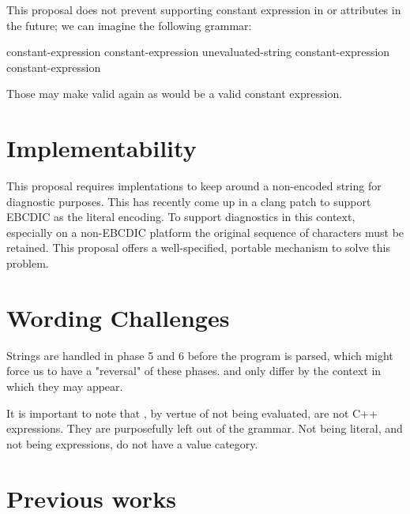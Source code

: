 \documentclass{wg21}
\begin{document}
This proposal does not prevent supporting constant expression in  or attributes in
the future; we can imagine the following grammar:

\begin{bnf}
    \br
     \terminal{(} constant-expression \terminal{)} \terminal{;}\br
     \terminal{(} constant-expression \terminal{,} unevaluated-string \terminal{)} \terminal{;}\br
     \terminal{(} constant-expression \terminal{,} constant-expression \terminal{)} \terminal{;}
\end{bnf}

Those may make  valid again as  would be a valid constant expression.


\section{Implementability}

This proposal requires implentations to keep around a non-encoded string for diagnostic purposes.
This has recently come up in a clang patch to support EBCDIC as the literal encoding.
To support diagnostics in this context, especially on a non-EBCDIC platform the original sequence of characters must be retained.
This proposal offers a well-specified, portable mechanism to solve this problem.

\section{Wording Challenges}

Strings are handled in phase 5 and 6 before the program is parsed,
which might force us to have a "reversal" of these phases.
 and  only differ by the context in which they may appear.

It is important to note that , by vertue of not being evaluated, are not C++ expressions.
They are purposefully left out of the  grammar.
Not being literal, and not being expressions,  do not have a value category.

\section{Previous works}
\end{document}
